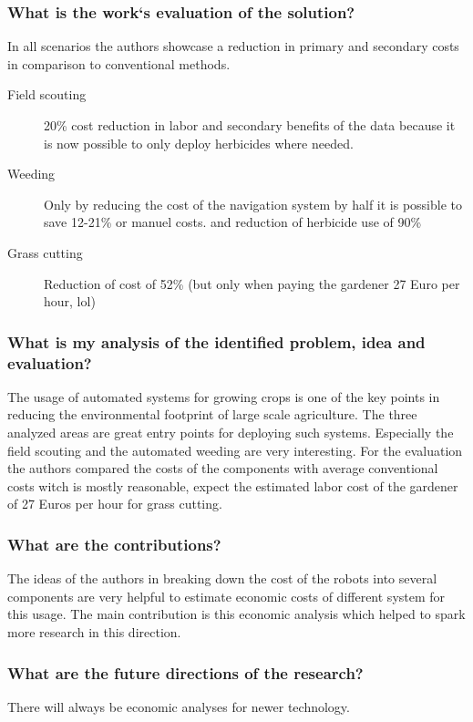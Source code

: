     \subsubsection*{What is the work`s evaluation of the solution?}
    In all scenarios the authors showcase a reduction in primary and secondary costs in comparison to conventional methods.
    \begin{description}
        \item[Field scouting] 20\% cost reduction in labor and secondary benefits of the data because it is now possible to only deploy herbicides where needed.
        \item[Weeding] Only by reducing the cost of the navigation system by half it is possible to save 12-21\% or manuel costs. and reduction of herbicide use of 90\%   
        \item[Grass cutting] Reduction of cost of 52\% (but only when paying the gardener 27 Euro per hour, lol) 
    \end{description}
    \subsubsection*{What is my analysis of the identified problem, idea and evaluation?}
    The usage of automated systems for growing crops is one of the key points in reducing the environmental footprint
    of large scale agriculture. The three analyzed areas are great entry points for deploying such systems. Especially 
    the field scouting and the automated weeding are very interesting. For the evaluation the authors compared 
    the costs of the components with average conventional costs witch is mostly reasonable, expect the estimated
    labor cost of the gardener of 27 Euros per hour for grass cutting.
    \subsubsection*{What are the contributions?}
    The ideas of the authors in breaking down the cost of the robots into several components are very helpful to estimate economic costs of different system for
    this usage. The main contribution is this economic analysis which helped to spark more research in this direction.
    \subsubsection*{What are the future directions of the research?}
    There will always be economic analyses for newer technology.  
